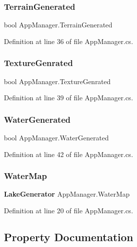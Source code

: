 \subsubsection{Terrain\+Generated}
{\footnotesize\ttfamily bool App\+Manager.\+Terrain\+Generated}



Definition at line 36 of file App\+Manager.\+cs.

\mbox{\label{class_app_manager_ab728c608d9939b57c91742a675a873f0}} 
\subsubsection{Texture\+Genrated}
{\footnotesize\ttfamily bool App\+Manager.\+Texture\+Genrated}



Definition at line 39 of file App\+Manager.\+cs.

\mbox{\label{class_app_manager_af15f75f9bba0ea226bd21b7b97ad2e4c}} 
\subsubsection{Water\+Generated}
{\footnotesize\ttfamily bool App\+Manager.\+Water\+Generated}



Definition at line 42 of file App\+Manager.\+cs.

\mbox{\label{class_app_manager_af6a5d33f0bd90bb40e68f4da2d25fd61}} 
\subsubsection{Water\+Map}
{\footnotesize\ttfamily \textbf{ Lake\+Generator} App\+Manager.\+Water\+Map}



Definition at line 20 of file App\+Manager.\+cs.



\subsection{Property Documentation}
\mbox{\label{class_app_manager_a991d514fbc834bd57b609f528e9f4a43}} 
